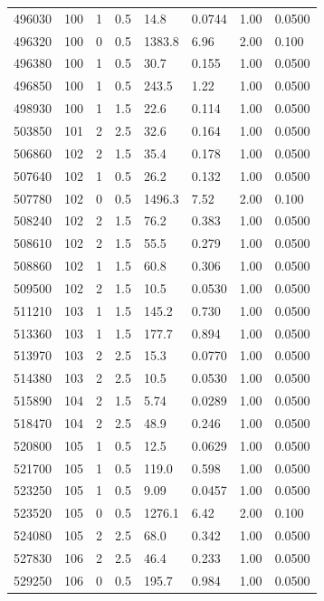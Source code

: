 \documentclass[preview]{standalone}
\begin{document}
{{{{{{{{\begin{tabular}{L{1.2cm}C{1.2cm} C{0.3cm}C{0.5cm} C{1.4cm}C{1.4cm} C{1.4cm}C{1.4cm}}
  496030  &   100  & 1     & 0.5 &  14.8  & 0.0744  & 1.00 &  0.0500   \\ 
  496320  &   100  & 0     & 0.5 &  1383.8  & 6.96  & 2.00 &  0.100   \\ 
  496380  &   100  & 1     & 0.5 &  30.7  & 0.155  & 1.00 &  0.0500   \\ 
  496850  &   100  & 1     & 0.5 &  243.5  & 1.22  & 1.00 &  0.0500   \\ 
  498930  &   100  & 1     & 1.5 &  22.6  & 0.114  & 1.00 &  0.0500   \\ 
  503850  &   101  & 2     & 2.5 &  32.6  & 0.164  & 1.00 &  0.0500   \\ 
  506860  &   102  & 2     & 1.5 &  35.4  & 0.178  & 1.00 &  0.0500   \\ 
  507640  &   102  & 1     & 0.5 &  26.2  & 0.132  & 1.00 &  0.0500   \\ 
  507780  &   102  & 0     & 0.5 &  1496.3  & 7.52  & 2.00 &  0.100   \\ 
  508240  &   102  & 2     & 1.5 &  76.2  & 0.383  & 1.00 &  0.0500   \\ 
  508610  &   102  & 2     & 1.5 &  55.5  & 0.279  & 1.00 &  0.0500   \\ 
  508860  &   102  & 1     & 1.5 &  60.8  & 0.306  & 1.00 &  0.0500   \\ 
  509500  &   102  & 2     & 1.5 &  10.5  & 0.0530  & 1.00 &  0.0500   \\ 
  511210  &   103  & 1     & 1.5 &  145.2  & 0.730  & 1.00 &  0.0500   \\ 
  513360  &   103  & 1     & 1.5 &  177.7  & 0.894  & 1.00 &  0.0500   \\ 
  513970  &   103  & 2     & 2.5 &  15.3  & 0.0770  & 1.00 &  0.0500   \\ 
  514380  &   103  & 2     & 2.5 &  10.5  & 0.0530  & 1.00 &  0.0500   \\ 
  515890  &   104  & 2     & 1.5 &  5.74  & 0.0289  & 1.00 &  0.0500   \\ 
  518470  &   104  & 2     & 2.5 &  48.9  & 0.246  & 1.00 &  0.0500   \\ 
  520800  &   105  & 1     & 0.5 &  12.5  & 0.0629  & 1.00 &  0.0500   \\ 
  521700  &   105  & 1     & 0.5 &  119.0  & 0.598  & 1.00 &  0.0500   \\ 
  523250  &   105  & 1     & 0.5 &  9.09  & 0.0457  & 1.00 &  0.0500   \\ 
  523520  &   105  & 0     & 0.5 &  1276.1  & 6.42  & 2.00 &  0.100   \\ 
  524080  &   105  & 2     & 2.5 &  68.0  & 0.342  & 1.00 &  0.0500   \\ 
  527830  &   106  & 2     & 2.5 &  46.4  & 0.233  & 1.00 &  0.0500   \\ 
  529250  &   106  & 0     & 0.5 &  195.7  & 0.984  & 1.00 &  0.0500   \\ 
\hline 
\end{tabular} 

}}}}}}}}
\end{document}
